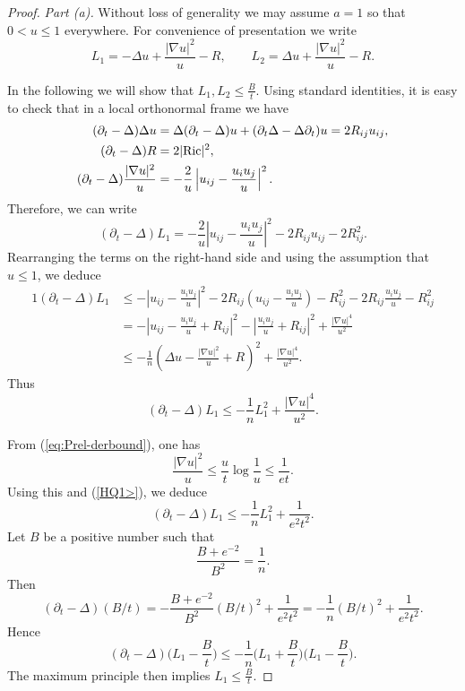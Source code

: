 \documentclass[11pt]{amsart}
\numberwithin{equation}{section}
\def\be{\begin{equation}}
\def\ee{\end{equation}}
\def\lab{\label}
\def\p{\partial}
\def\d{\nabla}
\DeclareMathOperator{\Ric}{Ric}
\numberwithin{equation}{section}
\begin{document}
\begin{proof} \textit{Part (a).}
Without loss of generality we may assume $a=1$ so that $0 < u \le 1$ everywhere.
For convenience of presentation we write
\[ L_1 = - \Delta u + \frac{|\d u|^2}{u} - R, \qquad L_2 = \Delta u + \frac{|\d u|^2}{u} - R. \]

In the following we will show that $L_1, L_2 \leq \frac{B}t$.
Using standard identities, it is easy to check that in a local orthonormal frame we have
 \begin{alignat}{1} 
 (\partial_t - \Delta ) \Delta u &= \Delta (\partial_t - \Delta ) u + (\p_t \Delta - \Delta \partial_t) u = 2 R_{ij} u_{ij} , \notag \\
 (\partial_t - \Delta ) R &= 2 | {\Ric} |^2, \notag \\
 (\partial_t - \Delta ) \frac{|\d u|^2}{u} &= - \frac{2}{u} \left| u_{ij} -\frac{ u_i u_j}{u} \right|^2. \label{eq:nabu2divu}
\end{alignat}
Therefore, we can write
\[
(\partial_t - \Delta ) L_1 = - \frac{2}{u} \left| u_{ij} -
  \frac{ u_i u_j}{u} \right|^2 - 2 R_{ij} u_{ij}  - 2 R_{ij}^2.
\] Rearranging the terms on the right-hand side and using the assumption that $u \le 1$,
we deduce
\begin{alignat*}{1}
(\partial_t - \Delta )
L_1 &\leq -\left| u_{ij} - \frac{ u_i u_j}{u} \right|^2 -
2 R_{ij} \left( u_{ij}   - \frac{ u_i u_j}{u} \right) -  R_{ij}^2
- 2 R_{ij} \frac{ u_i u_j}{u} -  R_{ij}^2\\
&= - \left| u_{ij} - \frac{ u_i u_j}{u} + R_{ij} \right|^2 - \left| \frac{ u_i u_j}{u} + R_{ij} \right|^2
+ \frac{|\d u|^4}{u^2}\\
&\leq - \frac{1}{n} \left( \Delta u - \frac{|\d u|^2}{u} + R \right)^2 + \frac{|\d u|^4}{u^2}.
\end{alignat*}
Thus
\be
\lab{HQ1>}
(\partial_t - \Delta ) L_1 \leq - \frac{1}{n} L^2_1 + \frac{|\d u|^4}{u^2}.
\ee

From (\ref{eq:Prel-derbound}), one has
\begin{equation} \label{eq:derivativeboundfromZ}
 \frac{|\d u|^2}{u}  \le \frac{u}{t} \log \frac{1}{u} \le \frac{1}{e t}.
\end{equation}
Using this and (\ref{HQ1>}), we deduce
\[ (\partial_t - \Delta ) L_1 \leq - \frac{1}{n} L^2_1 + \frac{1}{e^2 t^2}. \]
Let $B$ be a positive number such that
\[ \frac{B+e^{-2}}{B^2} = \frac{1}{n}. \]
Then
\[ (\partial_t - \Delta ) (B/t) = - \frac{B+e^{-2}}{B^2} (B/t)^2 + \frac{1}{e^2 t^2}=
- \frac{1}{n} (B/t)^2 + \frac{1}{e^2 t^2}. \]
Hence
\[ (\partial_t - \Delta ) \Big( L_1 - \frac{B}{t} \Big) \leq - \frac{1}{n} \Big(L_1+ \frac{B}{t} \Big) \Big(L_1- \frac{B}{t} \Big). \]
The maximum principle then implies $L_1 \le \frac{B}{t}$.


\end{proof}
\end{document}

